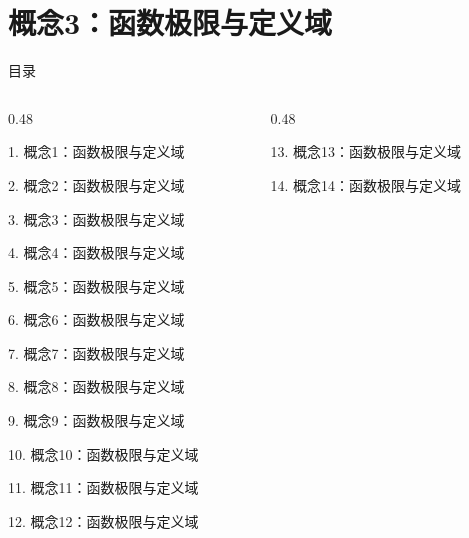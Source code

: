 \documentclass[aspectratio=169,10pt,fontset=fandol]{ctexbeamer}
\begin{document}
\section{概念3：函数极限与定义域}
\begin{frame}[t,fragile]{目录}
\small
\begin{columns}[T,onlytextwidth]
\begin{column}{0.48\textwidth}
{\color{black}\small 1. 概念1：函数极限与定义域\par}\vspace{0.22em}
{\color{black}\small 2. 概念2：函数极限与定义域\par}\vspace{0.22em}
{\color{blue}\small 3. 概念3：函数极限与定义域\par}\vspace{0.22em}
{\color{gray!40}\small 4. 概念4：函数极限与定义域\par}\vspace{0.22em}
{\color{gray!40}\small 5. 概念5：函数极限与定义域\par}\vspace{0.22em}
{\color{gray!40}\small 6. 概念6：函数极限与定义域\par}\vspace{0.22em}
{\color{gray!40}\small 7. 概念7：函数极限与定义域\par}\vspace{0.22em}
{\color{gray!40}\small 8. 概念8：函数极限与定义域\par}\vspace{0.22em}
{\color{gray!40}\small 9. 概念9：函数极限与定义域\par}\vspace{0.22em}
{\color{gray!40}\small 10. 概念10：函数极限与定义域\par}\vspace{0.22em}
{\color{gray!40}\small 11. 概念11：函数极限与定义域\par}\vspace{0.22em}
{\color{gray!40}\small 12. 概念12：函数极限与定义域\par}\vspace{0.22em}
\end{column}
\begin{column}{0.48\textwidth}
{\color{gray!40}\small 13. 概念13：函数极限与定义域\par}\vspace{0.22em}
{\color{gray!40}\small 14. 概念14：函数极限与定义域\par}\vspace{0.22em}

\end{column}
\end{columns}
\end{frame}
\end{document}
